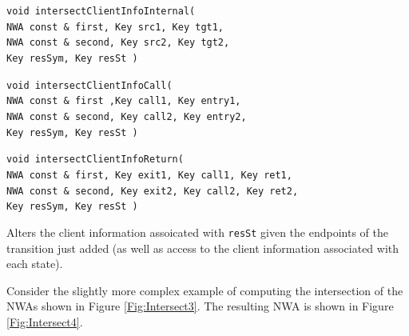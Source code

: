 \begin{description}
  \item\texttt{void intersectClientInfoInternal( \\ \hspace*{3.25cm}
    NWA const \& first, Key src1, Key tgt1,\\ \hspace*{3.25cm} NWA const \&
    second, Key src2, Key tgt2,\\ \hspace*{3.25cm} Key resSym, Key resSt )}
    \nopagebreak
  \item\texttt{void intersectClientInfoCall( \\ \hspace*{3.25cm}
    NWA const \& first ,Key call1, Key entry1,\\ \hspace*{3.25cm}
    NWA const \& second, Key call2, Key entry2,\\ \hspace*{3.25cm} Key
    resSym, Key resSt )} \nopagebreak
  \item\texttt{void intersectClientInfoReturn( \\ \hspace*{1.75cm}
    NWA const \& first, Key exit1, Key call1, Key ret1,\\ \hspace*{1.75cm}
    NWA const \& second, Key exit2, Key call2, Key ret2,\\ \hspace*{1.75cm}
    Key resSym, Key resSt )}

    Alters the client information assoicated with \texttt{resSt} given the
    endpoints of the transition just added (as well as access to the client
    information associated with each state).

\end{description}


Consider the slightly more complex example of computing the intersection of
the NWAs shown in Figure \ref{Fig:Intersect3}.  The resulting NWA is shown in
Figure \ref{Fig:Intersect4}.

